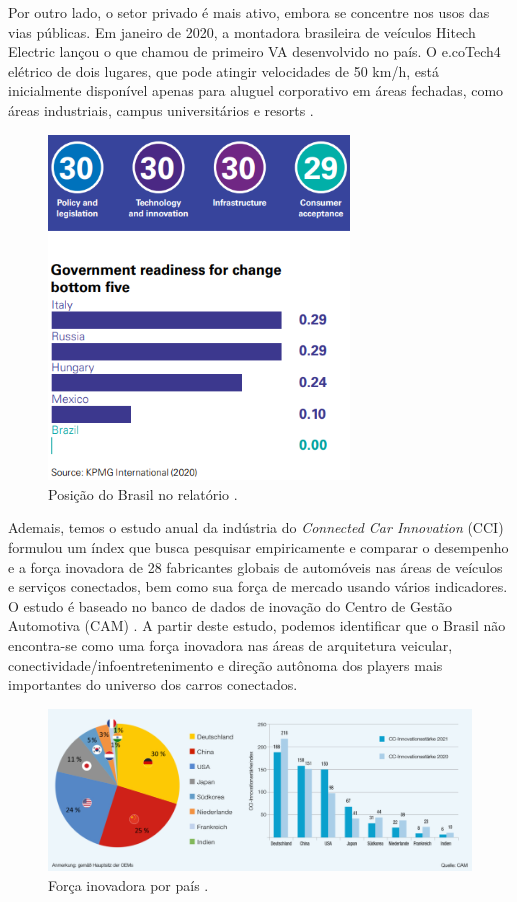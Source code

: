Por outro lado, o setor privado é mais ativo, embora se concentre nos usos das vias públicas. Em janeiro de 2020, a montadora brasileira de veículos Hitech Electric lançou o que chamou de primeiro VA desenvolvido no país. O e.coTech4 elétrico de dois lugares, que pode atingir velocidades de 50 km/h, está inicialmente disponível apenas para aluguel corporativo em áreas fechadas, como áreas industriais, campus universitários e resorts \cite{KPMG}.

\begin{figure}[H]
\centering
\includegraphics[width=8cm]{Figures/rank30.png}
\caption{Posição do Brasil no relatório \cite{KPMG}.}
\label{rank30}
\end{figure}

Ademais, temos o estudo anual da indústria do \textit{Connected Car Innovation} (CCI) formulou um índex que busca pesquisar empiricamente e comparar o desempenho e a força inovadora de 28 fabricantes globais de automóveis nas áreas de veículos e serviços conectados, bem como sua força de mercado usando vários indicadores. O estudo é baseado no banco de dados de inovação do Centro de Gestão Automotiva (CAM) \cite{CCI}. A partir deste estudo, podemos identificar que o Brasil não encontra-se como uma força inovadora nas áreas de arquitetura veicular, conectividade/infoentretenimento e direção autônoma dos players mais importantes do universo dos carros conectados.


\begin{figure}[H]
\centering
\includegraphics[width=12cm]{Figures/CCI.jpg}
\caption{Força inovadora por país  \cite{CCI}.}
\label{forcaCCI}
\end{figure}


